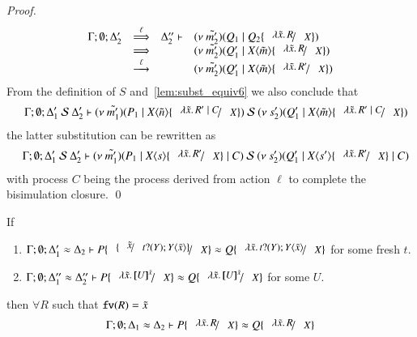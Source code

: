 \begin{proof}
%
\[
	\begin{array}{rcll}
		\Gamma; \es; \Delta_2' &\By{\ell}& \Delta_2'' \proves &
		\newsp{\tilde{m_2'}}{Q_1 \Par Q_2 \subst{\abs{\tilde{x}}{R}}{X}}\\
		&\By{}& &
		\newsp{\tilde{m_2'}}{Q_1' \Par \appl{X}{\tilde{m}} \subst{\abs{\tilde{x}}{R}}{X}} \\
		&\by{\ell}& &
		\newsp{\tilde{m_2'}}{Q_1' \Par \appl{X}{\tilde{m}} \subst{\abs{\tilde{x}}{R'}}{X}} \\
	\end{array}
\]
%
	\noi From the definition of $S$ and~\ref{lem:subst_equiv6}
	we also conclude that
	\begin{eqnarray*}
		&& \horel{\Gamma}
		{\Delta_1'}{\newsp{\tilde{m_1'}}{P_1 \Par \appl{X}{\tilde{n}} \subst{\abs{\tilde{x}}{R' \Par C}}{X}}}
		{\ \mathcal{S}\ }
		{\Delta_2'}{\newsp{s_2'}{Q_1' \Par \appl{X}{\tilde{m}} \subst{\abs{\tilde{x}}{R' \Par C}}{X}}}
	\end{eqnarray*}
%
	\noi the latter substitution can be rewritten as
%
	\begin{eqnarray*}
		&&\horel{\Gamma}
		{\Delta_1'}{\newsp{\tilde{m_1'}}{P_1 \Par \appl{X}{s} \subst{\abs{\tilde{x}}{R'}}{X} \Par C}}
		{\ \mathcal{S}\ }
		{\Delta_2'}{\newsp{s_2'}{Q_1' \Par \appl{X}{s'} \subst{\abs{\tilde{x}}{R'}}{X} \Par C}}
	\end{eqnarray*}
%
	\noi with process $C$ being the process derived from action $\ell$
	to complete the bisimulation closure.
	\qed
\end{proof}



\begin{corollary}\rm
	\label{cor:subst_equiv}
	If 
%
	\begin{enumerate}
		\item	$\horel{\Gamma}{\Delta_1'}{P \subst{\subst{\tilde{x}}{\binp{t}{Y} \appl{Y}{\tilde{x}}}}{X}}{\wb}{\Delta_2}{Q \subst{\abs{\tilde{x}}{\binp{t}{Y} \appl{Y}{\tilde{x}}}}{X}}$
			for some fresh $t$.

		\item	$\horel{\Gamma}{\Delta_1''}{P \subst{\abs{\tilde{x}}{\map{U}^{\tilde{x}}}}{X}}{\wb}{\Delta_2''}{Q \subst{\abs{\tilde{x}}{\map{U}^{\tilde{x}}}}{X}}$
			for some $U$.
	\end{enumerate}
%
	then $\forall R$ such that $\mathtt{fv}(R) = \tilde{x}$
\[
	\horel{\Gamma}{\Delta_1}{P \subst{\abs{\tilde{x}}{R}}{X}}{\wb}{\Delta_2}{Q \subst{\abs{\tilde{x}}{R}}{X}}
\]
\end{corollary}


